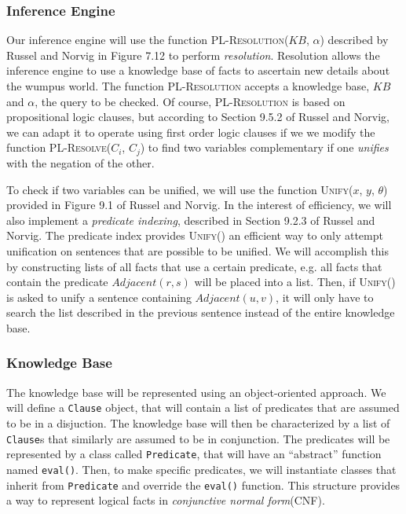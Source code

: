 \documentclass{article}
\begin{document}
			\subsubsection{Inference Engine}
			\label{inference}
			
				Our inference engine will use the function \textsc{PL-Resolution}($KB$, $\alpha$) described by Russel and Norvig in Figure 7.12 \cite{ai} to perform \textit{resolution}. 
				Resolution allows the inference engine to use a knowledge base of facts to ascertain new details about the wumpus world. 
				The function \textsc{PL-Resolution} accepts a knowledge base, $KB$ and $\alpha$, the query to be checked. Of course, \textsc{PL-Resolution} is based on propositional logic clauses, but according to Section 9.5.2 of Russel and Norvig, we can adapt it to operate using first order logic clauses if we we modify the function \textsc{PL-Resolve($C_i$, $C_j$)} to find two variables complementary if one \textit{unifies} with the negation of the other. 
				
				To check if two variables can be unified, we will use the function \textsc{Unify}($x$, $y$, $\theta$) provided in Figure 9.1 of Russel and Norvig.
				In the interest of efficiency, we will also implement a \textit{predicate indexing}, described in Section 9.2.3 of Russel and Norvig\cite{ai}.
				The predicate index provides \textsc{Unify}() an efficient way to only attempt unification on sentences that are possible to be unified. 
				We will accomplish this by constructing lists of all facts that use a certain predicate, e.g. all facts that contain the predicate $Adjacent(r,s)$ will be placed into a list.
				Then, if \textsc{Unify()} is asked to unify a sentence containing $Adjacent(u,v)$, it will only have to search the list described in the previous sentence instead of the entire knowledge base.
				
			\subsubsection{Knowledge Base}
			
				The knowledge base will be represented using an object-oriented approach.
				We will define a \texttt{Clause} object, that will contain a list of predicates that are assumed to be in a disjuction. The knowledge base will then be characterized by a list of \texttt{Clause}s that similarly are assumed to be in conjunction. 
				The predicates will be represented by a class called \texttt{Predicate}, that will have an ``abstract'' function named \texttt{eval()}.
				Then, to make specific predicates, we will instantiate classes that inherit from \texttt{Predicate} and override the \texttt{eval()} function.
				This structure provides a way to represent logical facts in \textit{conjunctive normal form}(CNF).
				
\end{document}
